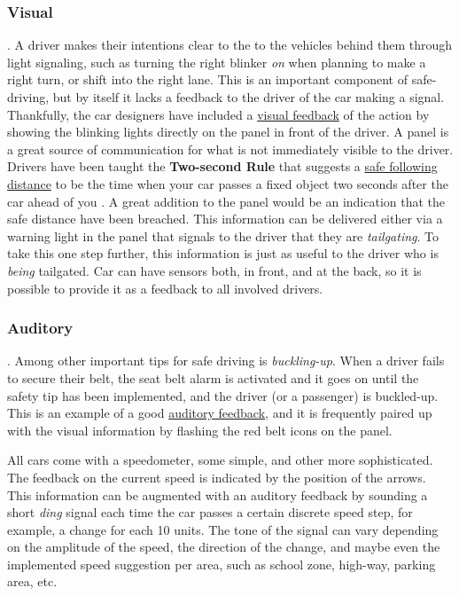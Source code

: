 \documentclass[12pt,letterpaper]{article}
\begin{document}
\subsubsection*{Visual}.
A driver makes their intentions clear to the to the vehicles behind them through light signaling, such as turning the right blinker \textit{on} when planning to make a right turn, or shift into the right lane. This is an important component of safe-driving, but by itself it lacks a feedback to the driver of the car making a signal. Thankfully, the car designers have included a \underline{visual feedback} of the action by showing the blinking lights directly on the panel in front of the driver. A panel is a great source of communication for what is not immediately visible to the driver. Drivers have been taught the \textbf{Two-second Rule} that suggests a \underline{safe following distance} to be the time when your car passes a fixed object two seconds after the car ahead of you \cite{wiki:driving_tips}. A great addition to the panel would be an indication that the safe distance have been breached. This information can be delivered either via a warning light in the panel that signals to the driver that they are \textit{tailgating}. To take this one step further, this information is just as useful to the driver who is \textit{being} tailgated. Car can have sensors both, in front, and at the back, so it is possible to provide it as a feedback to all involved drivers. 

\subsubsection*{Auditory}.
Among other important tips for safe driving is \textit{buckling-up}. When a driver fails to secure their belt, the seat belt alarm is activated and it goes on until the safety tip has been implemented, and the driver (or a passenger) is buckled-up. This is an example of a good \underline{auditory feedback}, and it is frequently paired up with the visual information by flashing the red belt icons on the panel.

All cars come with a speedometer, some simple, and other more sophisticated. The feedback on the current speed is indicated by the position of the arrows. This information can be augmented with an auditory feedback by sounding a short \textit{ding} signal each time the car passes a certain discrete speed step, for example, a change for each 10 units. The tone of the signal can vary depending on the amplitude of the speed, the direction of the change, and maybe even the implemented speed suggestion per area, such as school zone, high-way, parking area, etc. 
\end{document}

